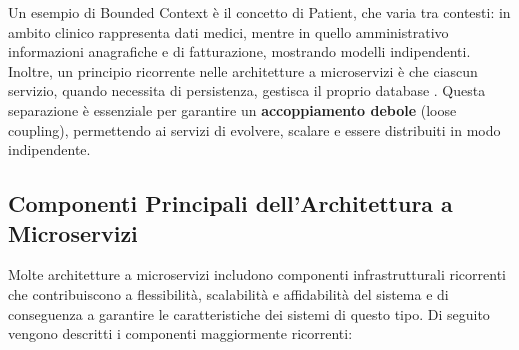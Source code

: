 Un esempio di Bounded Context è il concetto di Patient, che varia tra contesti: in ambito clinico rappresenta dati medici, mentre in quello amministrativo informazioni anagrafiche e di fatturazione, mostrando modelli indipendenti.
Inoltre, un principio ricorrente nelle architetture a microservizi è che ciascun servizio, quando necessita di persistenza, gestisca il proprio database \cite{Fowler2014, Soldani2018PainsGains}. Questa separazione è essenziale per garantire un \textbf{accoppiamento debole} (loose coupling), permettendo ai servizi di evolvere, scalare e essere distribuiti in modo indipendente.

\subsection{Componenti Principali dell'Architettura a Microservizi}
Molte architetture a microservizi includono componenti infrastrutturali ricorrenti che contribuiscono a flessibilità, scalabilità e affidabilità del sistema\cite{gfg_microservices} e di conseguenza a garantire le caratteristiche dei sistemi di questo tipo. Di seguito vengono descritti i componenti maggiormente ricorrenti:

